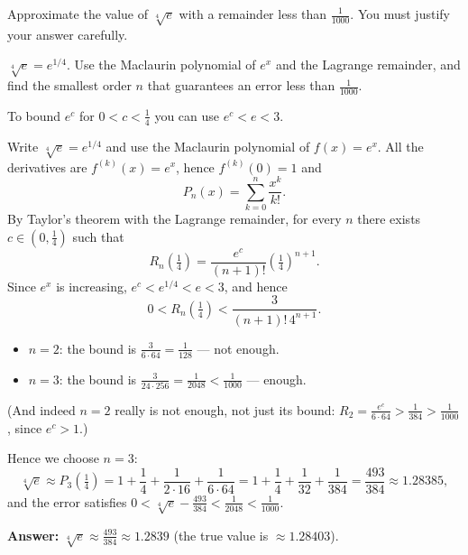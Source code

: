 
\begin{question}
Approximate the value of $\sqrt[4]{e}$ with a remainder less than $\frac{1}{1000}$. You must justify your answer carefully.
\end{question}

\begin{hint}
$\sqrt[4]{e}=e^{1/4}$. Use the Maclaurin polynomial of $e^x$ and the Lagrange remainder, and find the smallest order $n$ that guarantees an error less than $\frac{1}{1000}$.
\end{hint}

\begin{hint}
To bound $e^c$ for $0<c<\frac14$ you can use $e^c<e<3$.
\end{hint}

\begin{solution}
Write $\sqrt[4]{e}=e^{1/4}$ and use the Maclaurin polynomial of $f(x)=e^x$. All the derivatives are $f^{(k)}(x)=e^x$, hence $f^{(k)}(0)=1$ and
\[ P_n(x)=\sum_{k=0}^n\frac{x^k}{k!}. \]
By Taylor's theorem with the Lagrange remainder, for every $n$ there exists $c\in(0,\tfrac14)$ such that
\[ R_n\left(\tfrac14\right)=\frac{e^c}{(n+1)!}\left(\tfrac14\right)^{n+1}. \]
Since $e^x$ is increasing, $e^c<e^{1/4}<e<3$, and hence
\[ 0<R_n\left(\tfrac14\right)<\frac{3}{(n+1)!\,4^{n+1}}. \]
\begin{itemize}
  \item $n=2$: the bound is $\frac{3}{6\cdot64}=\frac{1}{128}$ --- not enough.
  \item $n=3$: the bound is $\frac{3}{24\cdot256}=\frac{1}{2048}<\frac{1}{1000}$ --- enough.
\end{itemize}
(And indeed $n=2$ really is not enough, not just its bound: $R_2=\frac{e^c}{6\cdot64}>\frac{1}{384}>\frac1{1000}$, since $e^c>1$.)

Hence we choose $n=3$:
\[ \sqrt[4]{e}\approx P_3\left(\tfrac14\right)=1+\frac14+\frac{1}{2\cdot16}+\frac{1}{6\cdot64}=1+\frac14+\frac1{32}+\frac1{384}=\frac{493}{384}\approx1.28385, \]
and the error satisfies $0<\sqrt[4]{e}-\frac{493}{384}<\frac{1}{2048}<\frac{1}{1000}$.

\textbf{Answer:} $\boxed{\sqrt[4]{e}\approx\frac{493}{384}\approx1.2839}$ (the true value is $\approx1.28403$).
\end{solution}
